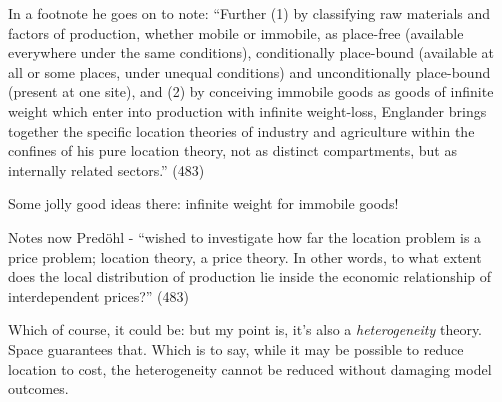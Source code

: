 In a footnote he goes on to note: ``Further (1) by classifying raw materials and factors of production, whether mobile or immobile, as place-free (available everywhere under the same conditions), conditionally place-bound (available at all or some places, under unequal conditions) and unconditionally place-bound (present at one site), and (2) by conceiving immobile goods as goods of infinite weight which enter into production with infinite weight-loss, Englander brings together the specific location theories of industry and agriculture within the confines of his pure location theory, not as distinct compartments, but as internally related sectors.'' (483)

Some jolly good ideas there: infinite weight for immobile goods!

Notes now Pred\"{o}hl - ``wished to investigate how far the location problem is a price problem; location theory, a price theory. In other words, to what extent does the local distribution of production lie inside the economic relationship of interdependent prices?'' (483)

Which of course, it could be: but my point is, it's also a \emph{heterogeneity} theory. Space guarantees that. Which is to say, while it may be possible to reduce location to cost, the heterogeneity cannot be reduced without damaging model outcomes.












